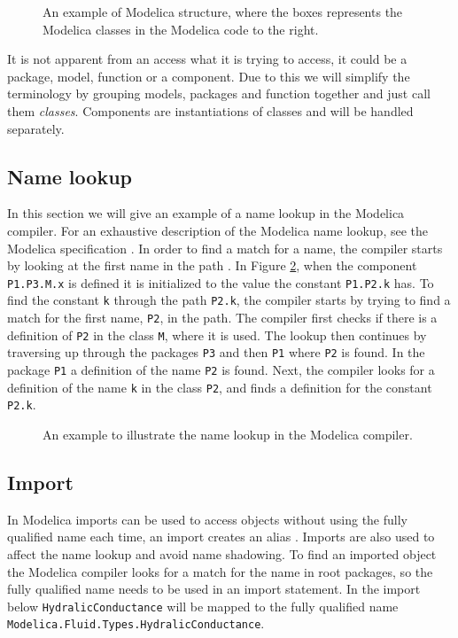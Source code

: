 \documentclass{cslthse-msc}
\begin{document}
\begin{figure}[!htbp]
    \centering
    \qquad
    \subfloat{\raisebox{3.2 cm}{}}
    \caption{An example of Modelica structure, where the boxes represents the Modelica classes in the Modelica code to the right.}
    \label{fig:modelicaExample}
\end{figure}

It is not apparent from an access what it is trying to access, it could be a package, model, function or a component. Due to this we will simplify the terminology by grouping models, packages and function together and just call them \emph{classes}. Components are instantiations of classes and will be handled separately.

\subsection{Name lookup}
In this section we will give an example of a name lookup in the Modelica compiler. For an exhaustive description of the Modelica name lookup, see the Modelica specification \cite{modelicamodelica}. In order to find a match for a name, the compiler starts by looking at the first name in the path \cite{modelicamodelica, tillermodelica}. In Figure \ref{fig:nameLookup}, when the component \texttt{P1.P3.M.x} is defined it is initialized to the value the constant \texttt{P1.P2.k} has. To find the constant \texttt{k} through the path \texttt{P2.k}, the compiler starts by trying to find a match for the first name, \texttt{P2}, in the path. The compiler first checks if there is a definition of \texttt{P2} in the class \texttt{M}, where it is used. The lookup then continues by traversing up through the packages \texttt{P3} and then \texttt{P1} where \texttt{P2} is found.  In the package \texttt{P1} a definition of the name \texttt{P2} is found. Next, the compiler looks for a definition of the name \texttt{k} in the class \texttt{P2}, and finds a definition for the constant \texttt{P2.k}.

\begin{figure}[!htbp]
    \centering
    
    \caption{An example to illustrate the name lookup in the Modelica compiler.}
    \label{fig:nameLookup}
\end{figure}

\subsection{Import}
In Modelica imports can be used to access objects without using the fully qualified name each time, an import creates an alias \cite{tillermodelica}. Imports are also used to affect the name lookup and avoid name shadowing. To find an imported object the Modelica compiler looks for a match for the name in root packages, so the fully qualified name needs to be used in an import statement. In the import below \texttt{HydralicConductance} will be mapped to the fully qualified name \texttt{Modelica.Fluid.Types.HydralicConductance}.
\end{document}
